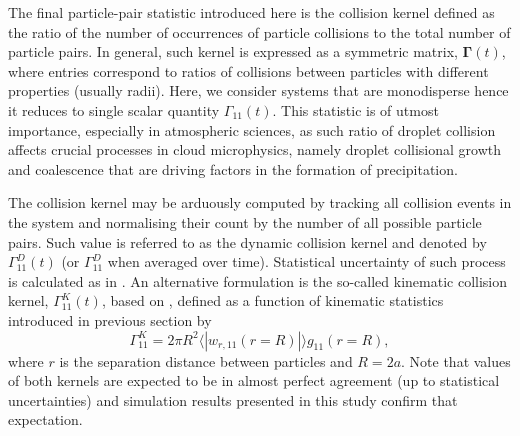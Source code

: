 \documentclass{pracamgren}
\begin{document}
The final particle-pair statistic introduced here is the collision kernel defined as the ratio of the number of occurrences of particle collisions to the total number of particle pairs.
In general, such kernel is expressed as a symmetric matrix, $\mathbf{\Gamma}(t)$, where entries correspond to ratios of collisions between particles with different properties (usually radii).
Here, we consider systems that are monodisperse hence it reduces to single scalar quantity $\Gamma_{11}(t)$.
This statistic is of utmost importance, especially in atmospheric sciences, as such ratio of droplet collision affects crucial processes in cloud microphysics, namely droplet collisional growth and coalescence that are driving factors in the formation of precipitation.   

The collision kernel may be arduously computed by tracking all collision events in the system and normalising their count by the number of all possible particle pairs.
Such value is referred to as the dynamic collision kernel and denoted by $\Gamma^D_{11}(t)$ (or $\Gamma^D_{11}$ when averaged over time).
Statistical uncertainty of such process is calculated as in \textcite[Equation 17 therein]{Rosa2013}.
An alternative formulation is the so-called kinematic collision kernel, $\Gamma^K_{11}(t)$, based on \textcite{Sundaram1997}, defined as a function of kinematic statistics introduced in previous section by
\begin{equation}
\Gamma^K_{11} = 2 \pi R^{2} \langle | w_{r, 11}(r = R) | \rangle g_{11}(r = R),
\label{eqn:gamma-k}
\end{equation}
where $r$ is the separation distance between particles and $R = 2a$.
Note that values of both kernels are expected to be in almost perfect agreement (up to statistical uncertainties) and simulation results presented in this study confirm that expectation.
\end{document}
